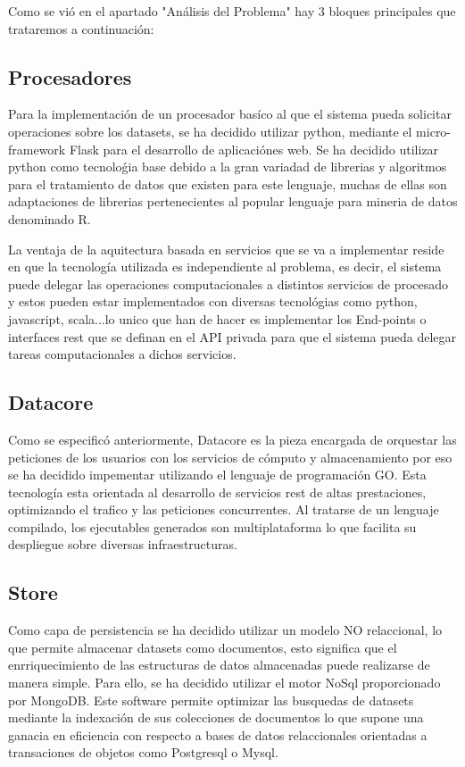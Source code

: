 \documentclass[a4paper,11pt]{book}
\begin{document}
Como se vió en el apartado "Análisis del Problema" hay 3 bloques principales que trataremos a continuación:  

\subsection{Procesadores}

Para la implementación de un procesador basíco al que el sistema pueda solicitar operaciones sobre los datasets, se ha decidido utilizar python, mediante el micro-framework Flask para el desarrollo de aplicaciónes web. Se ha decidido utilizar python como tecnoloǵia base debido a la gran variadad de librerias y algoritmos para el tratamiento de datos que existen para este lenguaje, muchas de ellas son adaptaciones de librerias pertenecientes al popular lenguaje para mineria de datos denominado R. 

La ventaja de la aquitectura basada en servicios que se va a implementar reside en que la tecnología utilizada es independiente al problema, es decir, el sistema puede delegar las operaciones computacionales a distintos servicios de procesado y estos pueden estar implementados con diversas tecnológias como python, javascript, scala...lo unico que han de hacer es implementar los End-points o interfaces rest que se definan en el API privada para que el sistema pueda delegar tareas computacionales a dichos servicios.

\subsection{Datacore}

Como se especificó anteriormente, Datacore es la pieza encargada de orquestar las peticiones de los usuarios con los servicios de cómputo y almacenamiento por eso se ha decidido impementar utilizando el lenguaje de programación GO. Esta tecnología esta orientada al desarrollo de servicios rest de altas prestaciones, optimizando el trafico y las peticiones concurrentes. Al tratarse de un lenguaje compilado, los ejecutables generados son multiplataforma lo que facilita su despliegue sobre diversas infraestructuras. 

\subsection{Store}

Como capa de persistencia se ha decidido utilizar un modelo NO relaccional, lo que permite almacenar datasets como documentos, esto significa que el enrriquecimiento de las estructuras de datos almacenadas puede realizarse de manera simple. Para ello, se ha decidido utilizar el motor NoSql proporcionado por MongoDB. Este software permite optimizar las busquedas de datasets mediante la indexación de sus colecciones de documentos lo que supone una ganacia en eficiencia con respecto a bases de datos relaccionales orientadas a transaciones de objetos como Postgresql o Mysql.        
\end{document}
